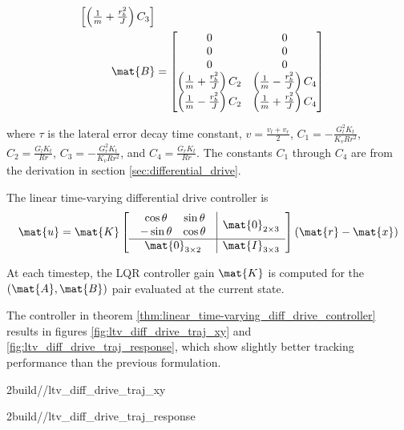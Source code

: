 \begin{theorem}
\begin{align}
\begin{bmatrix}
        \left(\frac{1}{m} + \frac{r_b^2}{J}\right) C_3
    \end{bmatrix} \\
    \mat{B} &=
    \begin{bmatrix}
      0 & 0 \\
      0 & 0 \\
      0 & 0 \\
      \left(\frac{1}{m} + \frac{r_b^2}{J}\right) C_2 &
      \left(\frac{1}{m} - \frac{r_b^2}{J}\right) C_4 \\
      \left(\frac{1}{m} - \frac{r_b^2}{J}\right) C_2 &
      \left(\frac{1}{m} + \frac{r_b^2}{J}\right) C_4
    \end{bmatrix}
  \end{align}

  where $\tau$ is the lateral error decay time constant,
  $v = \frac{v_l + v_r}{2}$, $C_1 = -\frac{G_l^2 K_t}{K_v R r^2}$,
  $C_2 = \frac{G_l K_t}{Rr}$, $C_3 = -\frac{G_r^2 K_t}{K_v R r^2}$, and
  $C_4 = \frac{G_r K_t}{Rr}$. The constants $C_1$ through $C_4$ are from the
  derivation in section \ref{sec:differential_drive}.

  The linear time-varying differential drive controller is
  \begin{equation}
    \mat{u} = \mat{K}
    \left[
      \begin{array}{c|c}
        \begin{array}{cc}
          \cos\theta & \sin\theta \\
          -\sin\theta & \cos\theta
        \end{array} & \mat{0}_{2 \times 3} \\
        \hline
        \mat{0}_{3 \times 2} & \mat{I}_{3 \times 3}
      \end{array}
    \right]
    (\mat{r} - \mat{x})
  \end{equation}

  At each timestep, the LQR controller gain $\mat{K}$ is computed for the
  $(\mat{A}, \mat{B})$ pair evaluated at the current state.
\end{theorem}

The controller in theorem \ref{thm:linear_time-varying_diff_drive_controller}
results in figures \ref{fig:ltv_diff_drive_traj_xy} and
\ref{fig:ltv_diff_drive_traj_response}, which show slightly better tracking
performance than the previous formulation.
\begin{bookfigure}
  \begin{minisvg}{2}{build/\chapterpath/ltv_diff_drive_traj_xy}
    \caption{Linear time-varying differential drive controller x-y plot}
    \label{fig:ltv_diff_drive_traj_xy}
  \end{minisvg}
  \hfill
  \begin{minisvg}{2}{build/\chapterpath/ltv_diff_drive_traj_response}
    \caption{Linear time-varying differential drive controller response}
    \label{fig:ltv_diff_drive_traj_response}
  \end{minisvg}
\end{bookfigure}

